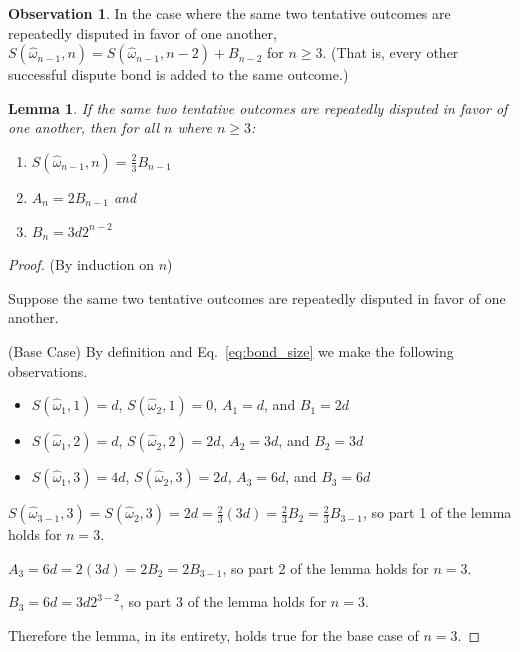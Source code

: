 \documentclass[floatfix,reprint,nofootinbib,amsmath,amssymb,epsfig,pre,floats,letterpaper,groupedaffiliation]{revtex4-1}
\newtheorem{lemma}[theorem]{Lemma}
\theoremstyle{definition}
\newtheorem{observation}{Observation}
\theoremstyle{definition}
\begin{document}
\begin{appendix}
\begin{observation}\label{ob:every_other_dispute_stake_applies_to_same_outcome}
In the case where the same two tentative outcomes are repeatedly disputed in favor of one another, $S(\hat{\omega}_{n-1},n) = S(\hat{\omega}_{n-1},n-2) + B_{n-2}$ for $n \geq 3$.  (That is, every other successful dispute bond is added to the same outcome.)
\end{observation}

\begin{lemma}\label{le:bond_sizes}
If the same two tentative outcomes are repeatedly disputed in favor of one another, then for all $n$ where $n \geq 3$:
\begin{enumerate}
\item{$S(\hat{\omega}_{n-1},n)=\frac{2}{3}B_{n-1}$}
\item{$A_{n} = 2B_{n-1}$ and}
\item{$B_{n} = 3d2^{n-2}$}
\end{enumerate}
\end{lemma}

\begin{proof}
(By induction on $n$)

Suppose the same two tentative outcomes are repeatedly disputed in favor of one another.


(Base Case)
By definition and Eq.~\ref{eq:bond_size} we make the following observations.

\begin{itemize}
\item{$S(\hat{\omega}_{1},1)=d$, $S(\hat{\omega}_{2},1)=0$, $A_{1}=d$, and $B_{1}=2d$}
\item{$S(\hat{\omega}_{1},2)=d$, $S(\hat{\omega}_{2},2)=2d$, $A_{2}=3d$, and $B_{2}=3d$}
\item{$S(\hat{\omega}_{1},3)=4d$, $S(\hat{\omega}_{2},3)=2d$, $A_{3}=6d$, and $B_{3}=6d$}
\end{itemize}

$S(\hat{\omega}_{3-1},3)=S(\hat{\omega}_{2},3)=2d=\frac{2}{3}(3d)=\frac{2}{3}B_{2}=\frac{2}{3}B_{3-1}$, so part 1 of the lemma holds for $n=3$.

$A_{3}=6d=2(3d)=2B_{2}=2B_{3-1}$, so part 2 of the lemma holds for $n=3$.

$B_{3}=6d=3d2^{3-2}$, so part 3 of the lemma holds for $n=3$.

\vspace{4mm}

Therefore the lemma, in its entirety, holds true for the base case of $n=3$.


\end{proof}
\end{appendix}
\end{document}

